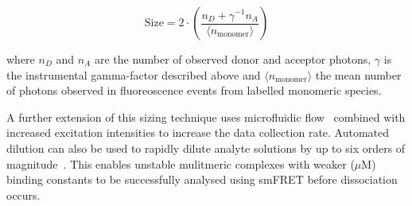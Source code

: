 \begin{equation}
\text{Size} = 2 \cdot \left(\frac{n_D + \gamma^{-1}n_A}{\langle n_{\text{monomer}}\rangle}\right)
\label{eq:sizing}
\end{equation}

where $n_D$ and $n_A$ are the number of observed donor and acceptor photons, $\gamma$ is the instrumental gamma-factor described above and $\langle n_{\text{monomer}}\rangle$ the mean number of photons observed in fluoreoscence events from labelled monomeric species.

A further extension of this sizing technique uses microfluidic flow~\cite{horrocks12} combined with increased excitation intensities to increase the data collection rate. Automated dilution can also be used to rapidly dilute analyte solutions by up to six orders of magnitude~\cite{horrocks2013,}. This enables unstable mulitmeric complexes with weaker ($\mu$M) binding constants to be successfully analysed using smFRET before dissociation occurs.  






